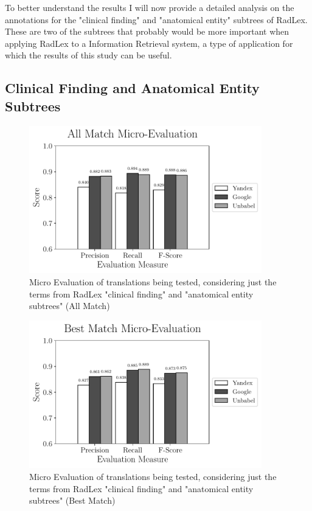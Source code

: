 To better understand the results I will now provide a detailed analysis on the annotations for the "clinical finding" and "anatomical entity" subtrees of RadLex. These are two of the subtrees that probably would be more important when applying RadLex to a Information Retrieval system, a type of application for which the results of this study can be useful.

\subsection{Clinical Finding and Anatomical Entity Subtrees}

\begin{figure}
	\centering
	\includegraphics[width=0.9\textwidth]{SupportFiles/plots/all_match_micro_clinical_anatomical_subtrees_plot.pdf}
	\caption{Micro Evaluation of translations being tested, considering just the terms from RadLex "clinical finding" and "anatomical entity subtrees" (All Match)}
	\label{fig:micro_eval_subtrees_all}
\end{figure}


\begin{figure}
	\centering
	\includegraphics[width=0.9\textwidth]{SupportFiles/plots/best_match_micro_clinical_anatomical_subtrees_plot.pdf}
	\caption{Micro Evaluation of translations being tested, considering just the terms from RadLex "clinical finding" and "anatomical entity subtrees" (Best Match)}
	\label{fig:micro_eval_subtrees_best}
\end{figure}


